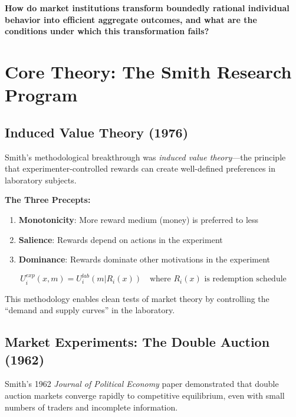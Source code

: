 \begin{tcolorbox}[colback=red!5!white, colframe=red!75!black,
    title=The Fundamental Question]
\textbf{How do market institutions transform boundedly rational individual
behavior into efficient aggregate outcomes, and what are the conditions under
which this transformation fails?}
\end{tcolorbox}


\section{Core Theory: The Smith Research Program}
\label{sec:vs-theory}

\subsection{Induced Value Theory (1976)}

Smith's methodological breakthrough was \textit{induced value theory}---the
principle that experimenter-controlled rewards can create well-defined
preferences in laboratory subjects.

\textbf{The Three Precepts:}
\begin{enumerate}
\item \textbf{Monotonicity}: More reward medium (money) is preferred to less
\item \textbf{Salience}: Rewards depend on actions in the experiment
\item \textbf{Dominance}: Rewards dominate other motivations in the experiment
\end{enumerate}

\begin{equation}
U_i^{exp}(x, m) = U_i^{lab}(m | R_i(x)) \quad \text{where } R_i(x) \text{ is redemption schedule}
\label{eq:vs-utility}
\end{equation}

This methodology enables clean tests of market theory by controlling the
``demand and supply curves'' in the laboratory.

\subsection{Market Experiments: The Double Auction (1962)}

Smith's 1962 \textit{Journal of Political Economy} paper demonstrated that
double auction markets converge rapidly to competitive equilibrium, even with
small numbers of traders and incomplete information.

